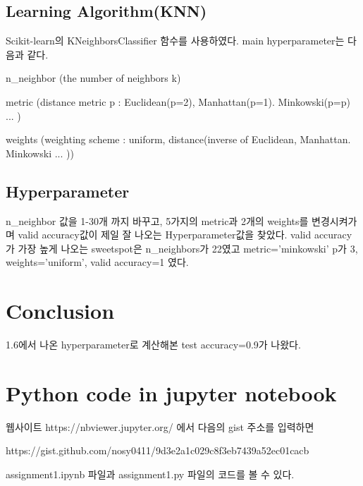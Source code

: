 \documentclass[a4paper, 11pt]{article}
\begin{document}
\subsection{Learning Algorithm(KNN)}
Scikit-learn의 KNeighborsClassifier 함수를 사용하였다. main hyperparameter는 다음과 같다.
\bitem
	\item n\_neighbor (the number of neighbors k)
	\item metric (distance metric p : Euclidean(p=2), Manhattan(p=1). Minkowski(p=p) ... )
	\item weights (weighting scheme : uniform, distance(inverse of Euclidean, Manhattan. Minkowski ... ))
\eitem

\subsection{Hyperparameter}
n\_neighbor 값을 1-30개 까지 바꾸고, 5가지의 metric과 2개의 weights를 변경시켜가며 valid accuracy값이 제일 잘 나오는 Hyperparameter값을 찾았다. 
valid accuracy가 가장 높게 나오는 sweetspot은 n\_neighbors가 22였고 metric='minkowski' p가 3, weights='uniform', valid accuracy=1 였다.
\section{Conclusion}
1.6에서 나온 hyperparameter로 계산해본 test accuracy=0.9가 나왔다.

\section{Python code in jupyter notebook}

웹사이트 https://nbviewer.jupyter.org/ 에서 다음의 gist 주소를 입력하면

\bitem
	\item  https://gist.github.com/nosy0411/9d3e2a1c029c8f3eb7439a52ec01cacb
\eitem

assignment1.ipynb 파일과 assignment1.py 파일의 코드를 볼 수 있다.
\end{document}
